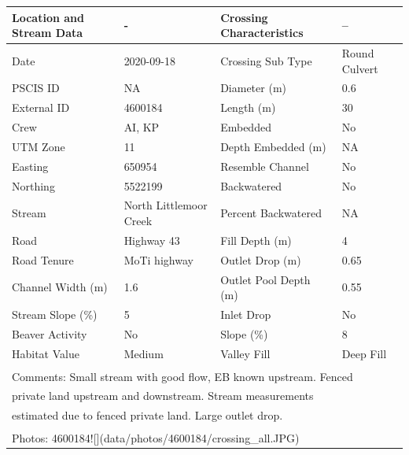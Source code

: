 \documentclass[
]{book}
\begin{document}
\begin{tabular}{l|l|l|l}
\hline
Location and Stream Data & - & Crossing Characteristics & --\\
\hline
Date & 2020-09-18 & Crossing Sub Type & Round Culvert\\
\hline
PSCIS ID & NA & Diameter (m) & 0.6\\
\hline
External ID & 4600184 & Length (m) & 30\\
\hline
Crew & AI, KP & Embedded & No\\
\hline
UTM Zone & 11 & Depth Embedded (m) & NA\\
\hline
Easting & 650954 & Resemble Channel & No\\
\hline
Northing & 5522199 & Backwatered & No\\
\hline
Stream & North Littlemoor Creek & Percent Backwatered & NA\\
\hline
Road & Highway 43 & Fill Depth (m) & 4\\
\hline
Road Tenure & MoTi highway & Outlet Drop (m) & 0.65\\
\hline
Channel Width (m) & 1.6 & Outlet Pool Depth (m) & 0.55\\
\hline
Stream Slope (\%) & 5 & Inlet Drop & No\\
\hline
Beaver Activity & No & Slope (\%) & 8\\
\hline
Habitat Value & Medium & Valley Fill & Deep Fill\\
\hline
\multicolumn{4}{l}{\textsuperscript{} Comments: Small stream with good flow, EB known upstream. Fenced}\\
\multicolumn{4}{l}{private land upstream and downstream. Stream measurements}\\
\multicolumn{4}{l}{estimated due to fenced private land.  Large outlet drop.}\\
\multicolumn{4}{l}{\textsuperscript{} Photos: 4600184![](data/photos/4600184/crossing\_all.JPG)}\\
\end{tabular}
\end{document}
